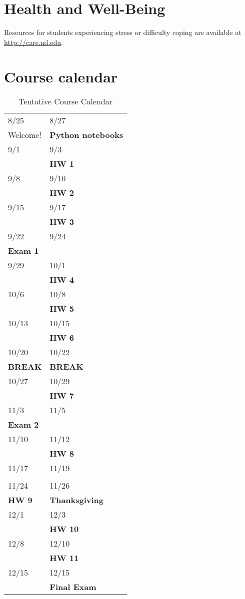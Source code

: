 \documentclass[11pt]{article}
\begin{document}
\section{Health and Well-Being}
\label{sec:org1a8dafd}
Resources for students experiencing stress or difficulty coping are available at \url{http://care.nd.edu}. 
\section{Course calendar}
\label{sec:orgcac3221}
\begin{table}[htbp]
\caption{Tentative Course Calendar}
\centering
\begin{tabular}{ll}
\hline
8/25 & 8/27\\
Welcome! & \textbf{Python notebooks}\\
\hline
9/1 & 9/3\\
 & \textbf{HW 1}\\
\hline
9/8 & 9/10\\
 & \textbf{HW 2}\\
\hline
9/15 & 9/17\\
 & \textbf{HW 3}\\
\hline
9/22 & 9/24\\
\textbf{Exam 1} & \\
\hline
9/29 & 10/1\\
 & \textbf{HW 4}\\
\hline
10/6 & 10/8\\
 & \textbf{HW 5}\\
\hline
10/13 & 10/15\\
 & \textbf{HW 6}\\
\hline
10/20 & 10/22\\
\textbf{BREAK} & \textbf{BREAK}\\
\hline
10/27 & 10/29\\
 & \textbf{HW 7}\\
\hline
11/3 & 11/5\\
\textbf{Exam 2} & \\
\hline
11/10 & 11/12\\
 & \textbf{HW 8}\\
\hline
11/17 & 11/19\\
 & \\
\hline
11/24 & 11/26\\
\textbf{HW 9} & \textbf{Thanksgiving}\\
\hline
12/1 & 12/3\\
 & \textbf{HW 10}\\
\hline
12/8 & 12/10\\
 & \textbf{HW 11}\\
\hline
12/15 & 12/15\\
 & \textbf{Final Exam}\\
\hline
\end{tabular}
\end{table}
\end{document}
